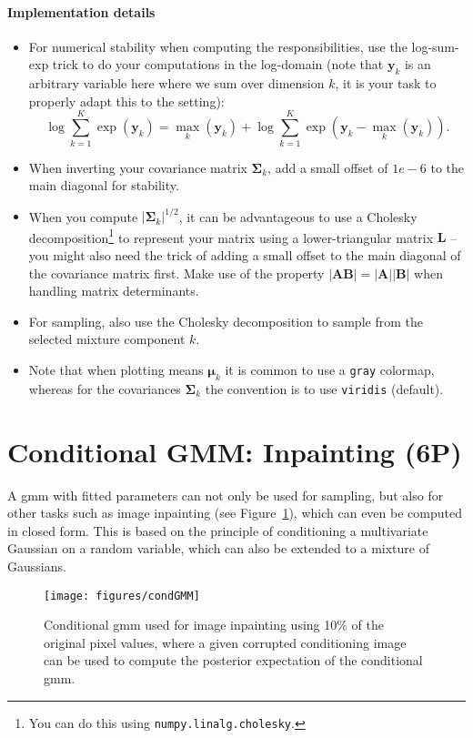 \documentclass{article}
\newcommand{\sig}{\boldsymbol{\Sigma}}
\newcommand{\m}{\boldsymbol{\mu}}
\renewcommand{\vec}[1]{\textbf{#1}}
\renewcommand{\vec}[1]{\textbf{#1}}
\begin{document}
\paragraph{Implementation details}
\begin{itemize}
\item For numerical stability when computing the responsibilities, use the log-sum-exp trick to do your computations in the log-domain (note that $\vec y_k$ is an arbitrary variable here where we sum over dimension $k$, it is your task to properly adapt this to the setting):
\[
\log \sum_{k=1}^K \exp(\vec y_k)  = \max_k(\vec y_k) + \log \sum_{k=1}^K \exp(\vec y_k - \max_k(\vec y_k)).
\]
\item When inverting your covariance matrix $\sig_k$, add a small offset of $1e-6$ to the main diagonal for stability. 
\item When you compute $|\boldsymbol{\Sigma}_k|^{1/2} $, it can be advantageous to use a Cholesky decomposition\footnote{You can do this using \texttt{numpy.linalg.cholesky}.} to represent your matrix using a lower-triangular matrix $\vec L$ -- you might also need the trick of adding a small offset to the main diagonal of the covariance matrix first. Make use of the property $|\vec A \vec B| = |\vec A||\vec B|$ when handling matrix determinants. 
\item For sampling, also use the Cholesky decomposition to sample from the selected mixture component $k$. 
\item Note that when plotting means $\m_k$ it is common to use a \texttt{gray} colormap, whereas for the covariances $\sig_k$ the convention is to use \texttt{viridis} (default). 
\end{itemize}

\section{Conditional GMM: Inpainting (6P)}
A \gls{gmm} with fitted parameters can not only be used for sampling, but also for other tasks such as image inpainting (see Figure~\ref{fig:condGMM}), which can even be computed in closed form. This is based on the principle of conditioning a multivariate Gaussian on a random variable, which can also be extended to a mixture of Gaussians. 
\begin{figure}[H]
\begin{center}
\texttt{[image: figures/condGMM]} \caption{Conditional \gls{gmm} used for image inpainting using 10\% of the original pixel values, where a given corrupted conditioning image can be used to compute the posterior expectation of the conditional \gls{gmm}.} \label{fig:condGMM}
\end{center}
\end{figure}
\end{document}
